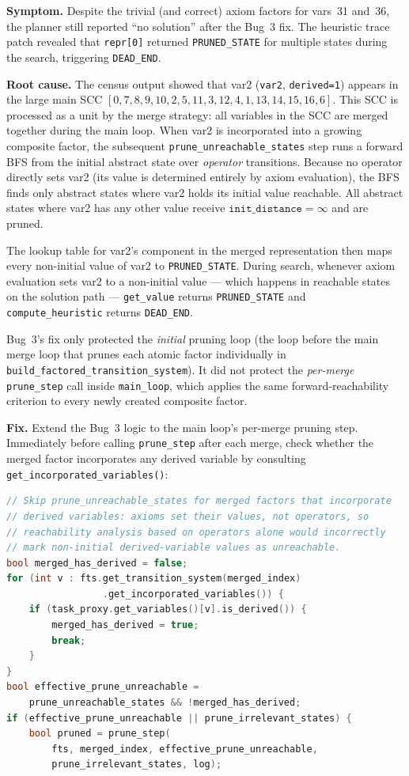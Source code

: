 \documentclass[11pt,a4paper]{article}
\begin{document}
\textbf{Symptom.} Despite the trivial (and correct) axiom factors for
vars~31 and~36, the planner still reported ``no solution'' after the Bug~3
fix.  The heuristic trace patch revealed that \texttt{repr[0]} returned
\texttt{PRUNED\_STATE} for multiple states during the search, triggering
\texttt{DEAD\_END}.

\textbf{Root cause.} The census output showed that var2 (\texttt{var2},
\texttt{derived=1}) appears in the large main SCC
$[0, 7, 8, 9, 10, 2, 5, 11, 3, 12, 4, 1, 13, 14, 15, 16, 6]$.
This SCC is processed as a unit by the merge strategy: all variables in the
SCC are merged together during the main loop.  When var2 is incorporated into
a growing composite factor, the subsequent \texttt{prune\_unreachable\_states}
step runs a forward BFS from the initial abstract state over
\emph{operator} transitions.  Because no operator directly sets var2 (its
value is determined entirely by axiom evaluation), the BFS finds only abstract
states where var2 holds its initial value reachable.  All abstract states
where var2 has any other value receive $\texttt{init\_distance} = \infty$
and are pruned.

The lookup table for var2's component in the merged representation then maps
every non-initial value of var2 to \texttt{PRUNED\_STATE}.  During search,
whenever axiom evaluation sets var2 to a non-initial value — which happens in
reachable states on the solution path — \texttt{get\_value} returns
\texttt{PRUNED\_STATE} and \texttt{compute\_heuristic} returns \texttt{DEAD\_END}.

Bug~3's fix only protected the \emph{initial} pruning loop (the loop before
the main merge loop that prunes each atomic factor individually in
\texttt{build\_factored\_transition\_system}).  It did not protect the
\emph{per-merge} \texttt{prune\_step} call inside \texttt{main\_loop}, which
applies the same forward-reachability criterion to every newly created
composite factor.

\textbf{Fix.} Extend the Bug~3 logic to the main loop's per-merge pruning
step.  Immediately before calling \texttt{prune\_step} after each merge, check
whether the merged factor incorporates any derived variable by consulting
\texttt{get\_incorporated\_variables()}:

\begin{lstlisting}[language=C++, caption={Skip unreachable-state pruning for merged factors with derived variables}]
// Skip prune_unreachable_states for merged factors that incorporate
// derived variables: axioms set their values, not operators, so
// reachability analysis based on operators alone would incorrectly
// mark non-initial derived-variable values as unreachable.
bool merged_has_derived = false;
for (int v : fts.get_transition_system(merged_index)
                 .get_incorporated_variables()) {
    if (task_proxy.get_variables()[v].is_derived()) {
        merged_has_derived = true;
        break;
    }
}
bool effective_prune_unreachable =
    prune_unreachable_states && !merged_has_derived;
if (effective_prune_unreachable || prune_irrelevant_states) {
    bool pruned = prune_step(
        fts, merged_index, effective_prune_unreachable,
        prune_irrelevant_states, log);
\end{lstlisting}
\end{document}

